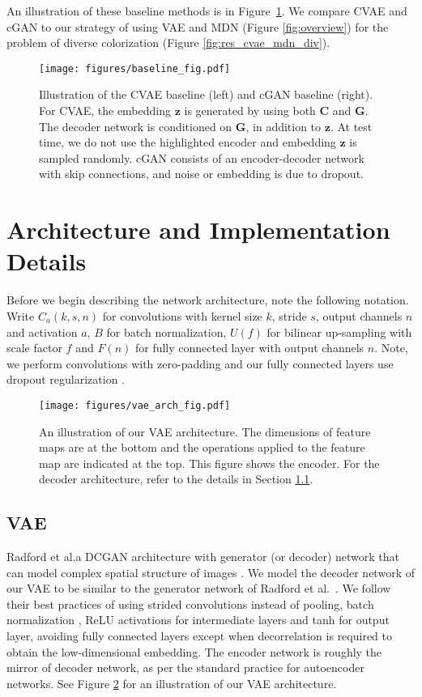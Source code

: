 \documentclass[10pt,twocolumn,letterpaper]{article}
\begin{document}
An illustration of these baseline methods is in Figure~\ref{fig:baseline}. We compare 
CVAE and cGAN to our strategy of using VAE and MDN (Figure \ref{fig:overview}) for the 
problem of diverse colorization (Figure \ref{fig:res_cvae_mdn_div}).

\begin{figure}[t]
\centering
\texttt{[image: figures/baseline\_fig.pdf]}
\caption{Illustration of the CVAE baseline (left) and cGAN baseline (right). For CVAE, the
embedding $\mathbf{z}$ is generated by using both $\mathbf{C}$ and $\mathbf{G}$. The decoder
network is conditioned on $\mathbf{G}$, in addition to $\mathbf{z}$. At test time, we
do not use the highlighted encoder and embedding $\mathbf{z}$ is sampled randomly. 
cGAN consists of an encoder-decoder network with skip connections, and noise or 
embedding is due to dropout.} 
\label{fig:baseline} 
\end{figure}
\section{Architecture and Implementation Details} Before we begin describing the network architecture, note
the following notation. Write $C_{a}(k, s, n)$ for convolutions with kernel size 
$k$, stride $s$, output channels $n$ and activation $a$, $B$ for batch 
normalization, $U(f)$ for bilinear up-sampling with scale factor $f$ and 
$F(n)$ for fully connected layer with output channels $n$. Note, we perform
convolutions with zero-padding and our fully connected layers use dropout
regularization \cite{Srivastava}. \\

\begin{figure}[t]
\centering
\texttt{[image: figures/vae\_arch\_fig.pdf]}
\caption{An illustration of our VAE architecture. The dimensions of feature maps are at
the bottom and the operations applied to the feature map are indicated at the top. This 
figure shows the encoder. For the decoder architecture, refer to the details in 
Section \ref{sec:arch_vae}.} 
\label{fig:vae_arch} 
\end{figure}\subsection{VAE}\label{sec:arch_vae}

Radford et al.\propose a DCGAN architecture with generator (or decoder) network 
that can model complex spatial structure of images \cite{DCGAN}. We model the 
decoder network of our VAE to be similar to the 
generator network of Radford et al.~\cite{DCGAN}. We follow their best practices of
using strided convolutions instead of pooling, batch normalization \cite{BN}, ReLU activations for 
intermediate layers and tanh for output layer, avoiding fully connected layers
except when decorrelation is required to obtain the low-dimensional embedding. The encoder 
network is roughly the mirror of decoder network, as per the standard practice 
for autoencoder networks. See Figure \ref{fig:vae_arch} for an illustration of our VAE 
architecture.\\
\end{document}

